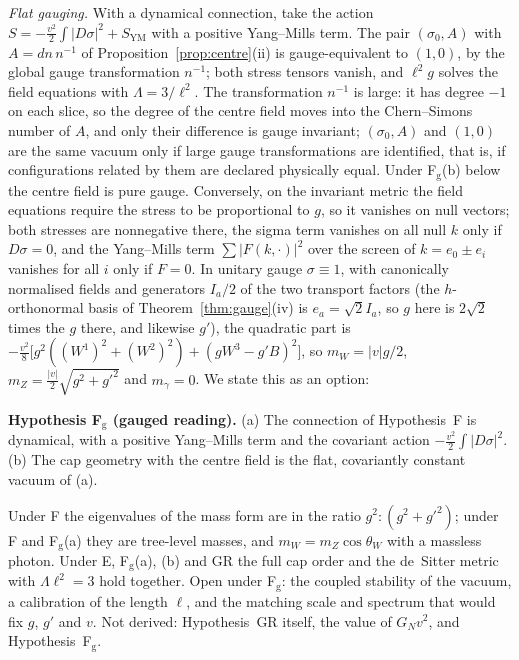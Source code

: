 \documentclass[aps,pra,onecolumn,superscriptaddress,nofootinbib,10pt]{revtex4-2}
\theoremstyle{definition}
\theoremstyle{remark}
\begin{document}
\smallskip\noindent\emph{Flat gauging.}  With a dynamical connection, take the action
$S=-\tfrac{v^2}2\int\lvert D\sigma\rvert^2+S_{\mathrm{YM}}$ with a positive Yang--Mills term.  The pair $(\sigma_0,A)$ with $A=dn\,n^{-1}$ of
Proposition~\ref{prop:centre}(ii) is gauge-equivalent to $(1,0)$, by the global gauge transformation $n^{-1}$;
both stress tensors vanish, and $\ell^2g$ solves the field equations with $\Lambda=3/\ell^2$.  The transformation $n^{-1}$ is
large: it has degree $-1$ on each slice, so the degree of the centre field moves into the Chern--Simons
number of $A$, and only their difference is gauge invariant; $(\sigma_0,A)$ and $(1,0)$ are the same vacuum only if
large gauge transformations are identified, that is, if configurations related by them are declared
physically equal.  Under F$_{\mathrm g}$(b) below the centre field is pure gauge.  Conversely, on the
invariant metric the field equations require the stress to be proportional to $g$, so it vanishes on null
vectors; both stresses are nonnegative there, the sigma term vanishes on all null $k$ only if $D\sigma=0$, and
the Yang--Mills term $\sum\lvert F(k,\cdot)\rvert^2$ over the screen of $k=e_0\pm e_i$ vanishes for all $i$ only if
$F=0$.  In unitary gauge $\sigma\equiv1$, with canonically normalised fields and generators $I_a/2$ of the two
transport factors (the $h$-orthonormal basis of Theorem~\ref{thm:gauge}(iv) is $e_a=\sqrt2I_a$, so $g$ here is $2\sqrt2$ times
the $g$ there, and likewise $g'$), the quadratic part is $-\tfrac{v^2}8\bigl[g^2((W^1)^2+(W^2)^2)+(gW^3-g'B)^2\bigr]$, so
$m_W=\lvert v\rvert g/2$, $m_Z=\tfrac{\lvert v\rvert}2\sqrt{g^2+g'^2}$ and $m_\gamma=0$.  We state this as an option:

\smallskip\noindent\textbf{Hypothesis F$_{\mathrm g}$ (gauged reading).}\label{hyp:Fg}  (a) The connection of Hypothesis~F is
dynamical, with a positive Yang--Mills term and the covariant action $-\tfrac{v^2}2\int\lvert D\sigma\rvert^2$.  (b) The cap
geometry with the centre field is the flat, covariantly constant vacuum of (a).

\smallskip\noindent Under F the eigenvalues of the mass form are in the ratio $g^2:(g^2+g'^2)$; under F and
F$_{\mathrm g}$(a) they are tree-level masses, and $m_W=m_Z\cos\theta_W$ with a massless photon.  Under E,
F$_{\mathrm g}$(a), (b) and GR the full cap order and the de~Sitter metric with $\Lambda\ell^2=3$ hold together.  Open
under F$_{\mathrm g}$: the coupled stability of the vacuum, a calibration of the length $\ell$, and the
matching scale and spectrum that would fix $g$, $g'$ and $v$.  Not derived: Hypothesis~GR itself, the
value of $G_Nv^2$, and Hypothesis~F$_{\mathrm g}$.
\end{document}
